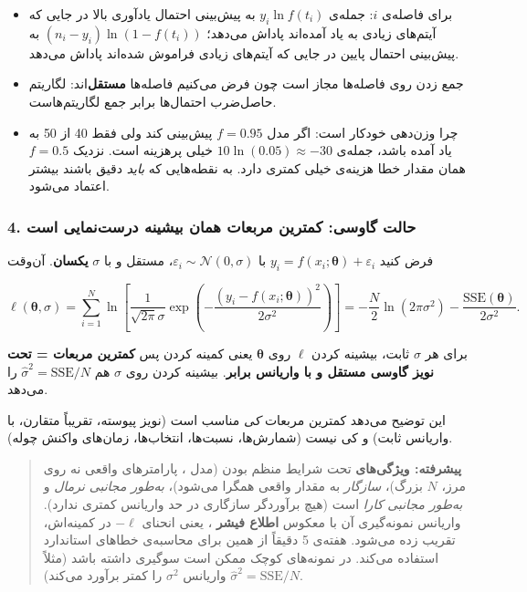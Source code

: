 \begin{itemize}
\tightlist
\item
  برای فاصله‌ی \(i\): جمله‌ی \(y_i \ln f(t_i)\) به پیش‌بینی احتمال یادآوری
  بالا در جایی که آیتم‌های زیادی به یاد آمده‌اند پاداش می‌دهد؛
  \((n_i - y_i)\ln(1 - f(t_i))\) به پیش‌بینی احتمال پایین در جایی که
  آیتم‌های زیادی فراموش شده‌اند پاداش می‌دهد.
\item
  جمع زدن روی فاصله‌ها مجاز است چون فرض می‌کنیم فاصله‌ها \textbf{مستقل}‌اند:
  لگاریتم حاصل‌ضرب احتمال‌ها برابر جمع لگاریتم‌هاست.
\item
  چرا وزن‌دهی خودکار است: اگر مدل \(f = 0.95\) پیش‌بینی کند ولی فقط 40 از
  50 به یاد آمده باشد، جمله‌ی \(10 \ln(0.05) \approx -30\) خیلی پرهزینه
  است. نزدیک \(f = 0.5\) همان مقدار خطا هزینه‌ی خیلی کمتری دارد. به
  نقطه‌هایی که \emph{باید} دقیق باشند بیشتر اعتماد می‌شود.
\end{itemize}

\subsubsection{4. حالت گاوسی: کمترین مربعات همان بیشینه درست‌نمایی است}

فرض کنید \(y_i = f(x_i;\boldsymbol\theta) + \varepsilon_i\) با
\(\varepsilon_i \sim \mathcal{N}(0,\allowbreak \sigma)\)، مستقل و با \(\sigma\)
\textbf{یکسان}. آن‌وقت

\[
\ell(\boldsymbol\theta, \sigma) = \sum_{i=1}^{N}\ln\left[\frac{1}{\sqrt{2\pi}\sigma}\exp\left(-\frac{(y_i - f(x_i;\boldsymbol\theta))^2}{2\sigma^2}\right)\right]
= -\frac{N}{2}\ln(2\pi\sigma^2) - \frac{\mathrm{SSE}(\boldsymbol\theta)}{2\sigma^2}.
\]

برای هر \(\sigma\) ثابت، بیشینه کردن \(\ell\) روی \(\boldsymbol\theta\)
یعنی کمینه کردن  پس \textbf{کمترین مربعات =  تحت نویز
گاوسی مستقل و با واریانس برابر}. بیشینه کردن روی \(\sigma\) هم
\(\hat\sigma^2 = \mathrm{SSE}/N\) را می‌دهد.

این توضیح می‌دهد کمترین مربعات \emph{کی} مناسب است (نویز پیوسته، تقریباً
متقارن، با واریانس ثابت) و کی نیست (شمارش‌ها، نسبت‌ها، انتخاب‌ها، زمان‌های
واکنش چوله).

\begin{quote}
\textbf{پیشرفته: ویژگی‌های } تحت شرایط منظم بودن (مدل
، پارامترهای واقعی نه روی مرز، \(N\) بزرگ)، 
\emph{سازگار}  به مقدار واقعی همگرا می‌شود)، \emph{به‌طور
مجانبی نرمال} و \emph{به‌طور مجانبی کارا} است (هیچ برآوردگر سازگاری در حد
واریانس کمتری ندارد). واریانس نمونه‌گیری آن با معکوس \textbf{اطلاع فیشر}
، یعنی انحنای \(-\ell\) در کمینه‌اش، تقریب زده
می‌شود. هفته‌ی 5 دقیقاً از همین برای محاسبه‌ی خطاهای استاندارد استفاده
می‌کند. در نمونه‌های کوچک  ممکن است سوگیری داشته باشد (مثلاً
\(\hat\sigma^2 = \mathrm{SSE}/N\) واریانس \(\sigma^2\) را کمتر برآورد
می‌کند).
\end{quote}

